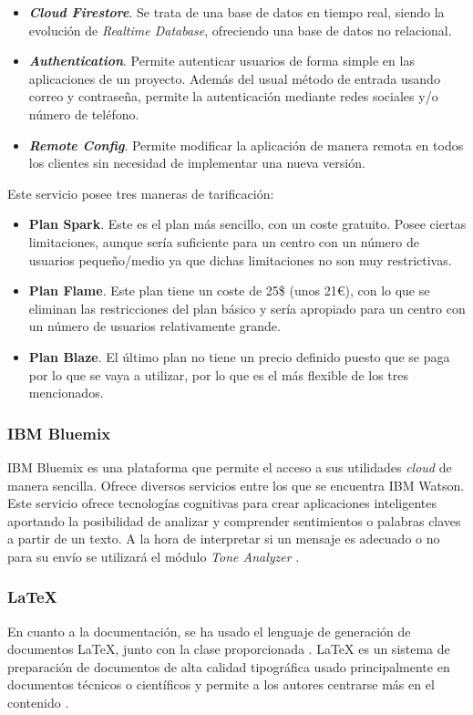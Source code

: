 \begin{itemize}
	\item \textbf{\textit{Cloud Firestore}}. Se trata de una base de datos en tiempo real, siendo la evolución de \textit{Realtime Database}, ofreciendo una base de datos no relacional.
	\item \textbf{\textit{Authentication}}. Permite autenticar usuarios de forma simple en las aplicaciones de un proyecto. Además del usual método de entrada usando correo y contraseña, permite la autenticación mediante redes sociales y/o número de teléfono.
	\item \textbf{\textit{Remote Config}}. Permite modificar la aplicación de manera remota en todos los clientes sin necesidad de implementar una nueva versión.
\end{itemize}

Este servicio posee tres maneras de tarificación:

\begin{itemize}
	\item \textbf{Plan Spark}. Este es el plan más sencillo, con un coste gratuito. Posee ciertas limitaciones, aunque sería suficiente para un centro con un número de usuarios pequeño/medio ya que dichas limitaciones no son muy restrictivas.
	\item \textbf{Plan Flame}. Este plan tiene un coste de 25\$ (unos 21\euro{}), con lo que se eliminan las restricciones del plan básico y sería apropiado para un centro con un número de usuarios relativamente grande.
	\item \textbf{Plan Blaze}. El último plan no tiene un precio definido puesto que se paga por lo que se vaya a utilizar, por lo que es el más flexible de los tres mencionados.
\end{itemize}

\subsubsection*{IBM Bluemix}
IBM Bluemix es una plataforma que permite el acceso a sus utilidades \textit{cloud} de manera sencilla. Ofrece diversos servicios entre los que se encuentra IBM Watson. Este servicio ofrece tecnologías cognitivas para crear aplicaciones inteligentes aportando la posibilidad de analizar y comprender sentimientos o palabras claves a partir de un texto. A la hora de interpretar si un mensaje es adecuado o no para su envío se utilizará el módulo \textit{Tone Analyzer} \cite{IBM}.

\subsubsection*{LaTeX}
En cuanto a la documentación, se ha usado el lenguaje de generación de documentos LaTeX, junto con la clase \esitfg{} proporcionada \cite{ARCO}. LaTeX es un sistema de preparación de documentos de alta calidad tipográfica usado principalmente en documentos técnicos o científicos y permite a los autores centrarse más en el contenido \cite{TheLatexProject}.